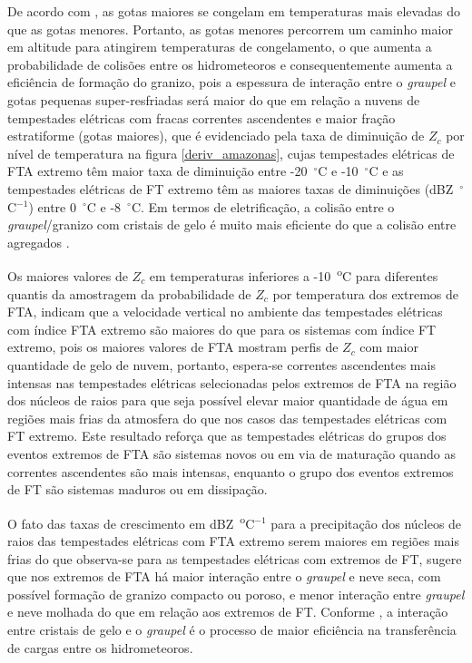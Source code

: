 De acordo com , as gotas maiores se congelam em temperaturas mais elevadas do que as gotas menores. Portanto, as gotas menores percorrem um caminho maior em altitude para atingirem temperaturas de congelamento, o que aumenta a probabilidade de colisões entre os hidrometeoros e consequentemente aumenta a eficiência de formação do granizo, pois a espessura de interação entre o \textit{graupel} e gotas pequenas super-resfriadas será maior do que em relação a nuvens de tempestades elétricas com fracas correntes ascendentes e maior fração estratiforme (gotas maiores), que é evidenciado pela taxa de diminuição de $Z_c$ por nível de temperatura na figura \ref{deriv_amazonas}, cujas  tempestades elétricas de FTA extremo têm maior taxa de diminuição entre -20~$^{\circ}$C e -10~$^{\circ}$C e as tempestades elétricas de FT extremo têm as maiores taxas de diminuições (dBZ~$^{\circ}$C$^{-1}$) entre 0~$^{\circ}$C e -8~$^{\circ}$C. Em termos de eletrificação, a colisão entre o \textit{graupel}/granizo  com cristais de gelo é muito mais eficiente do que a colisão entre agregados \cite{Takahashi1978, jayaratne1983}.


Os maiores valores de $Z_c$ em temperaturas inferiores a -10~\textsuperscript{o}C para diferentes quantis da amostragem da probabilidade de $Z_c$ por temperatura dos extremos de FTA, indicam que a velocidade vertical no ambiente das tempestades elétricas com índice FTA extremo são maiores do que para os sistemas com índice FT extremo, pois os maiores valores de FTA mostram perfis de $Z_c$ com maior quantidade de gelo de nuvem, portanto, espera-se correntes ascendentes mais intensas nas tempestades elétricas selecionadas pelos extremos de FTA na região dos núcleos de raios para que seja possível elevar maior quantidade de água em regiões mais frias da atmosfera do que nos casos das tempestades elétricas com FT extremo. Este resultado reforça que as tempestades elétricas do grupos dos eventos extremos de FTA são sistemas novos ou em via de maturação quando as correntes ascendentes são mais intensas, enquanto o grupo dos eventos extremos de FT são sistemas maduros ou em dissipação.

O fato das taxas de crescimento em dBZ~\textsuperscript{o}C$^{-1}$ para a precipitação dos núcleos de raios das tempestades elétricas com FTA extremo serem maiores  em regiões mais frias do que observa-se para as tempestades elétricas com extremos de FT, sugere que nos extremos de FTA há maior interação entre o \textit{graupel} e neve seca, com possível formação de granizo compacto ou poroso, e menor interação entre \textit{graupel} e neve molhada do que em relação aos extremos de FT. Conforme , a interação entre cristais de gelo e o \textit{graupel} é o processo de maior eficiência na transferência de cargas entre os hidrometeoros. 

